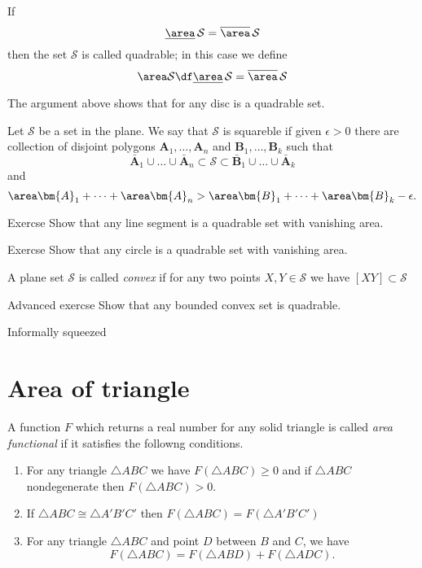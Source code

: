 If
\[\underline\area\,\mathcal{S}=\overline\area\,\mathcal{S}\]
then the set $\mathcal{S}$ is called quadrable;
in this case we define 
\[\area\mathcal{S}\df\underline\area\,\mathcal{S}=\overline\area\,\mathcal{S}\]

The argument above shows that for any disc is a quadrable set.

Let $\mathcal S$ be a set in the plane.
We say that $\mathcal S$ is squareble if 
given $\epsilon>0$ there are collection of disjoint polygons $\bm{A}_1,\dots, \bm{A}_n$ and $\bm{B}_1,\dots, \bm{B}_k$
such that
\[\bar{\bm{A}}_1\cup\dots\cup\bar{\bm{A}}_n\subset\mathcal S\subset \bar{\bm{B}}_1\cup\dots\cup\bar{\bm{A}}_k\]
and 
\[\area\bm{A}_1+\dots+\area\bm{A}_n
>
\area\bm{B}_1+\dots+\area\bm{B}_k-\epsilon.\]

\begin{thm}{Exercse}
Show that any line segment is a quadrable set with vanishing area.
\end{thm}

\begin{thm}{Exercse}
Show that any circle is a quadrable set with vanishing area.
\end{thm}

A plane set $\mathcal{S}$
is called \emph{convex} if for any two points $X,Y\in \mathcal{S}$
we have $[XY]\subset \mathcal{S}$

\begin{thm}{Advanced exercse}
Show that any bounded convex set is quadrable.
\end{thm}



Informally squeezed


\section*{Area of triangle}


A function $F$ which returns a real number 
for any solid triangle is called \emph{area functional} if it satisfies the followng conditions.

\begin{enumerate}
\item For any triangle $\triangle ABC$ we have $F(\triangle ABC)\ge 0$ and 
if  $\triangle ABC$ nondegenerate then $F(\triangle ABC)>0$.
\item If $\triangle ABC\cong\triangle A'B'C'$ 
 then $F(\triangle ABC)=F(\triangle A'B'C')$
\item For any triangle $ \triangle ABC$ and point $D$ between $B$ and $C$, we have
$$F(\triangle ABC)=F(\triangle ABD)+F(\triangle ADC).$$
\end{enumerate}

